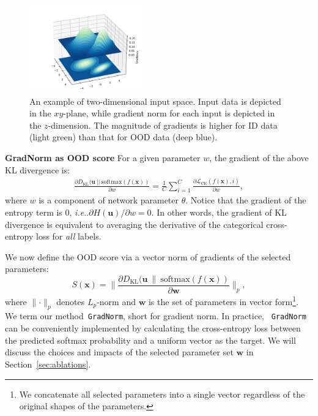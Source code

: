\documentclass{article}
\makeatletter
\def\*#1{\mathbf{#1}}
\DeclareRobustCommand\onedot{\futurelet\@let@token\@onedot}
\def\@onedot{\ifx\@let@token.\else.\null\fi\xspace}
\def\ie{\emph{i.e}\onedot} \def\Ie{\emph{I.e}\onedot}
\makeatother
\begin{document}
\begin{figure}
\vspace{-1cm}
    \includegraphics[width=0.45\textwidth]{figures/teaser_figure_new5.pdf}
        \vspace{-0.5cm}
    \caption{\small{An example of two-dimensional input space. Input data is depicted in the $xy$-plane, while gradient norm for each input is depicted in the $z$-dimension. The magnitude of gradients is higher for ID data ({\color{green}light green}) than that for OOD data ({\color{blue}deep blue}).}}
    \label{fig:teaser}
    \vspace{-1.5cm}
\end{figure}
\textbf{{GradNorm} as OOD score} For a given parameter $w$, the gradient of the above KL divergence is:
\begin{align}
    \frac{\partial D_\text{KL}(\*u~||~\text{softmax}(f(\*x))}{\partial w} = \frac{1}{C}\sum_{i=1}^C \frac{\partial \mathcal{L}_\text{CE}(f(\*x),i)}{\partial w},
\end{align}
where $w$ is a component of network parameter $\theta$. Notice that the gradient of the entropy term is $0$, \ie $\partial H(\*u) / \partial w=0$. In other words, the gradient of KL divergence is equivalent to averaging the derivative of the categorical cross-entropy loss for \emph{all} labels.

We now define the OOD score via a vector norm of gradients of the selected parameters:
\begin{equation}
\label{eq:score}
    S(\*x) = \lVert\frac{\partial D_\text{KL}(\*u~\lVert~\text{softmax}(f(\*x))}{\partial \*w}  \rVert_p,
\end{equation}
where $\lVert \cdot \rVert_p$ denotes $L_p$-norm and $\*w$ is the set of   parameters in vector form\footnote{We concatenate all selected parameters into a single vector regardless of the original shapes of the parameters.}. We term our method~\texttt{GradNorm}, short for gradient norm. In practice, ~\texttt{GradNorm} can be conveniently implemented by calculating the cross-entropy loss between the predicted softmax probability and a uniform vector as the target. We will discuss the choices and impacts of the selected parameter set $\*w$ in Section~\ref{sec:ablations}. 
\end{document}
